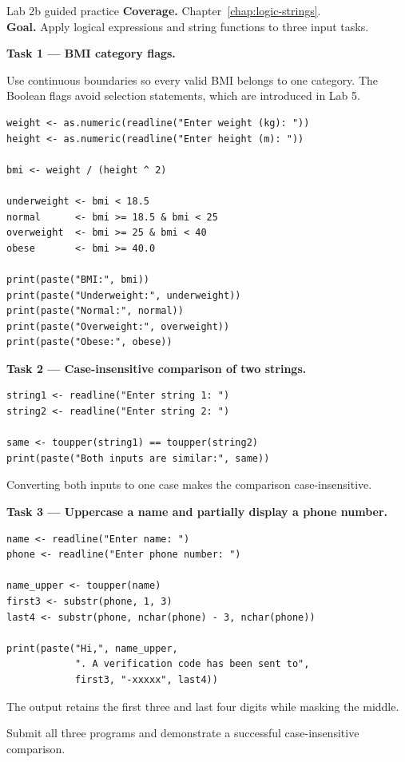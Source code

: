 
\begin{labproject}{Lab 2b guided practice}
\textbf{Coverage.} Chapter~\ref{chap:logic-strings}.\\
\textbf{Goal.} Apply logical expressions and string functions to three input tasks.

\textbf{Task 1 --- BMI category flags.}

Use continuous boundaries so every valid BMI belongs to one category. The Boolean flags avoid selection statements, which are introduced in Lab 5.

\begin{lstlisting}[style=dsr]
weight <- as.numeric(readline("Enter weight (kg): "))
height <- as.numeric(readline("Enter height (m): "))

bmi <- weight / (height ^ 2)

underweight <- bmi < 18.5
normal      <- bmi >= 18.5 & bmi < 25
overweight  <- bmi >= 25 & bmi < 40
obese       <- bmi >= 40.0

print(paste("BMI:", bmi))
print(paste("Underweight:", underweight))
print(paste("Normal:", normal))
print(paste("Overweight:", overweight))
print(paste("Obese:", obese))
\end{lstlisting}

\textbf{Task 2 --- Case-insensitive comparison of two strings.}

\begin{lstlisting}[style=dsr]
string1 <- readline("Enter string 1: ")
string2 <- readline("Enter string 2: ")

same <- toupper(string1) == toupper(string2)
print(paste("Both inputs are similar:", same))
\end{lstlisting}

Converting both inputs to one case makes the comparison case-insensitive.

\textbf{Task 3 --- Uppercase a name and partially display a phone number.}

\begin{lstlisting}[style=dsr]
name <- readline("Enter name: ")
phone <- readline("Enter phone number: ")

name_upper <- toupper(name)
first3 <- substr(phone, 1, 3)
last4 <- substr(phone, nchar(phone) - 3, nchar(phone))

print(paste("Hi,", name_upper,
            ". A verification code has been sent to",
            first3, "-xxxxx", last4))
\end{lstlisting}

The output retains the first three and last four digits while masking the middle.
\end{labproject}

\begin{labdeliverable}
Submit all three programs and demonstrate a successful case-insensitive comparison.
\end{labdeliverable}
